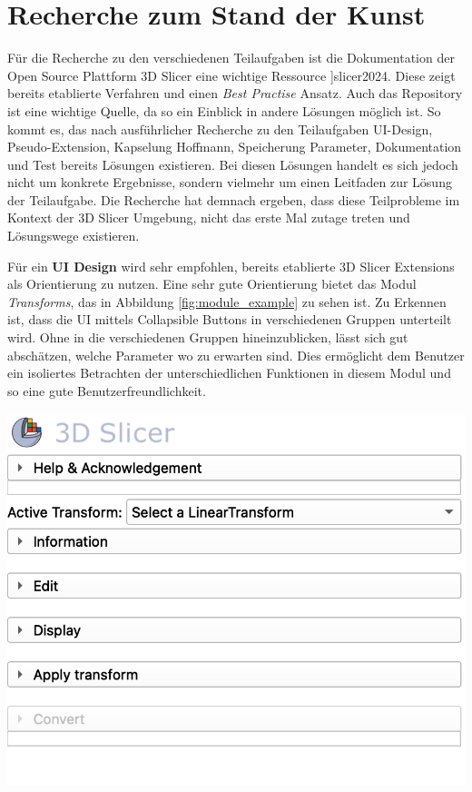 \section{Recherche zum Stand der Kunst}
\label{sec:recherche} Für die Recherche zu den verschiedenen Teilaufgaben ist
die Dokumentation der Open Source Plattform 3D Slicer eine wichtige Ressource
\cite[vgl.]{[}]{slicer2024}. Diese zeigt bereits etablierte Verfahren und einen \textit{Best
Practise} Ansatz. Auch das \citet{extensionsIndex2024} Repository ist eine
wichtige Quelle, da so ein Einblick in andere Lösungen möglich ist. So kommt es,
das nach ausführlicher Recherche zu den Teilaufgaben UI-Design, Pseudo-Extension,
Kapselung Hoffmann, Speicherung Parameter, Dokumentation und Test bereits Lösungen
existieren. Bei diesen Lösungen handelt es sich jedoch nicht um konkrete
Ergebnisse, sondern vielmehr um einen Leitfaden zur Lösung der Teilaufgabe. Die
Recherche hat demnach ergeben, dass diese Teilprobleme im Kontext der 3D Slicer Umgebung,
nicht das erste Mal zutage treten und Lösungswege existieren.

\begin{minipage}{0.40\textwidth}
	Für ein \textbf{UI Design} wird sehr empfohlen, bereits etablierte 3D Slicer Extensions
	als Orientierung zu nutzen. Eine sehr gute Orientierung bietet das Modul \textit{Transforms},
	das in Abbildung \ref{fig:module_example} zu sehen ist. Zu Erkennen ist, dass die
	UI mittels Collapsible Buttons in verschiedenen Gruppen unterteilt wird. Ohne
	in die verschiedenen Gruppen hineinzublicken, lässt sich gut abschätzen,
	welche Parameter wo zu erwarten sind. Dies ermöglicht dem Benutzer ein isoliertes
	Betrachten der unterschiedlichen Funktionen in diesem Modul und so eine gute Benutzerfreundlichkeit.
\end{minipage}
\hfill
\begin{minipage}{0.50\textwidth}
	\centering
	\includegraphics[scale=0.50]{img/modul_example.jpg}
	\label{fig:module_example}
\end{minipage}

